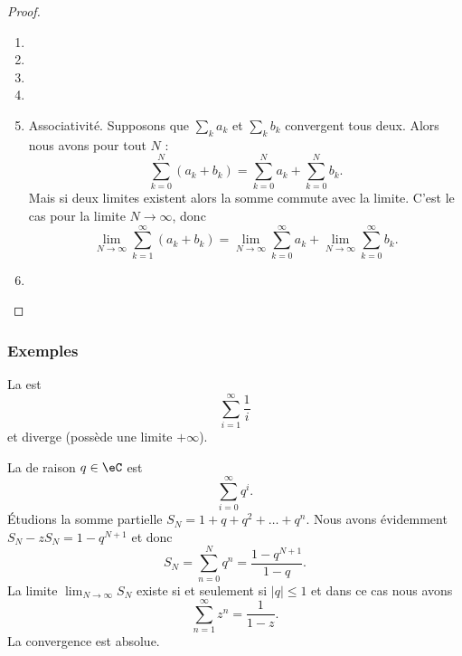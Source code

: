 \begin{proof}
    
    \begin{enumerate}
        \item
            
  \item
  \item 
  \item
\item 
Associativité. Supposons que \( \sum_ka_k\) et \( \sum_kb_k\) convergent tous deux. Alors nous avons pour tout \( N\) :
\begin{equation}
    \sum_{k=0}^N(a_k+b_k)=\sum_{k=0}^Na_k+\sum_{k=0}^Nb_k.
\end{equation}
Mais si deux limites existent alors la somme commute avec la limite. C'est le cas pour la limite \( N\to \infty\), donc
\begin{equation}
    \lim_{N\to \infty} \sum_{k=1}^{\infty}(a_k+b_k)=\lim_{N\to \infty} \sum_{k=0}^{\infty}a_k+\lim_{N\to \infty} \sum_{k=0}^{\infty}b_k.
\end{equation}
\item
    \end{enumerate}
\end{proof}

\subsubsection{Exemples}

\begin{example}
    La  est
    \begin{equation}
        \sum_{i=1}^\infty \frac1i
    \end{equation}
    et diverge (possède une limite $+\infty$).
\end{example}

\begin{example} \label{ExZMhWtJS}
    La  de raison $q \in \eC$ est
    \begin{equation}
        \sum_{i=0}^\infty q^i.
    \end{equation}
    Étudions la somme partielle \( S_N=1+q+q^2+\ldots +q^{n}\). Nous avons évidemment $S_N-zS_N=1-q^{N+1}$ et donc
    \begin{equation}    \label{EqASYTiCK}
        S_N=\sum_{n=0}^Nq^n=\frac{ 1-q^{N+1} }{ 1-q }.
    \end{equation}
    La limite \( \lim_{N\to \infty} S_N\) existe si et seulement si \( | q |\leq 1\) et dans ce cas nous avons
    \begin{equation}    \label{EqRGkBhrX}
        \sum_{n=1}^{\infty}z^n=\frac{ 1 }{ 1-z }.
    \end{equation}
    La convergence est absolue.
\end{example}

